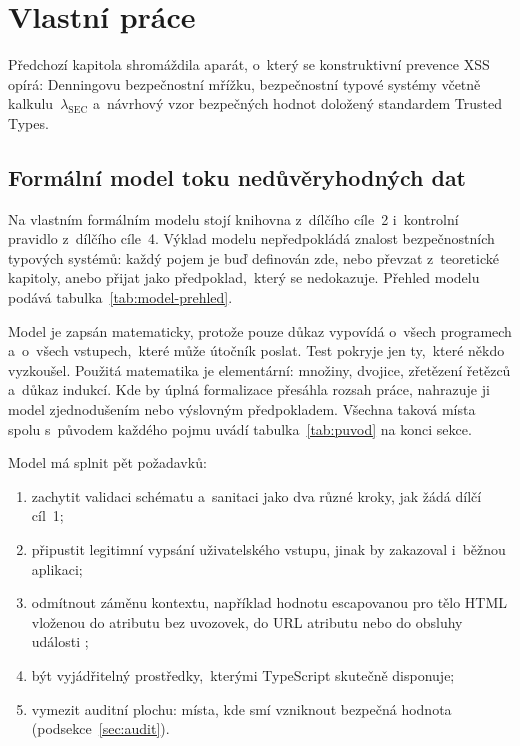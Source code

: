 \chapter{Vlastní práce}
\label{chap:practical}



Předchozí kapitola shromáždila aparát, o~který se konstruktivní prevence XSS opírá: Denningovu bezpečnostní mřížku, bezpečnostní typové systémy včetně kalkulu~$\lambda_{\mathrm{SEC}}$ a~návrhový vzor bezpečných hodnot doložený standardem Trusted Types.

\section{Formální model toku nedůvěryhodných dat}
\label{sec:model}

Na vlastním formálním modelu stojí knihovna z~dílčího cíle~2 i~kontrolní pravidlo z~dílčího cíle~4. Výklad modelu nepředpokládá znalost bezpečnostních typových systémů: každý pojem je buď definován zde, nebo převzat z~teoretické kapitoly, anebo přijat jako předpoklad,~který se nedokazuje. Přehled modelu podává tabulka~\ref{tab:model-prehled}.

Model je zapsán matematicky, protože pouze důkaz vypovídá o~všech programech a~o~všech vstupech,~které může útočník poslat. Test pokryje jen ty,~které někdo vyzkoušel. Použitá matematika je elementární: množiny, dvojice, zřetězení řetězců a~důkaz indukcí. Kde by úplná formalizace přesáhla rozsah práce, nahrazuje ji model zjednodušením nebo výslovným předpokladem. Všechna taková místa spolu s~původem každého pojmu uvádí tabulka~\ref{tab:puvod} na konci sekce.

Model má splnit pět požadavků:
\begin{enumerate}[label=(R\arabic*)]
    \item zachytit validaci schématu a~sanitaci jako dva různé kroky, jak žádá dílčí cíl~1;
    \item připustit legitimní vypsání uživatelského vstupu, jinak by zakazoval i~běžnou aplikaci;
    \item odmítnout záměnu kontextu, například hodnotu escapovanou pro tělo HTML vloženou do atributu bez uvozovek, do URL atributu nebo do obsluhy události \parencite{samuel2011context};
    \item být vyjádřitelný prostředky,~kterými TypeScript skutečně disponuje;
    \item vymezit auditní plochu: místa, kde smí vzniknout bezpečná hodnota (podsekce~\ref{sec:audit}).
\end{enumerate}

